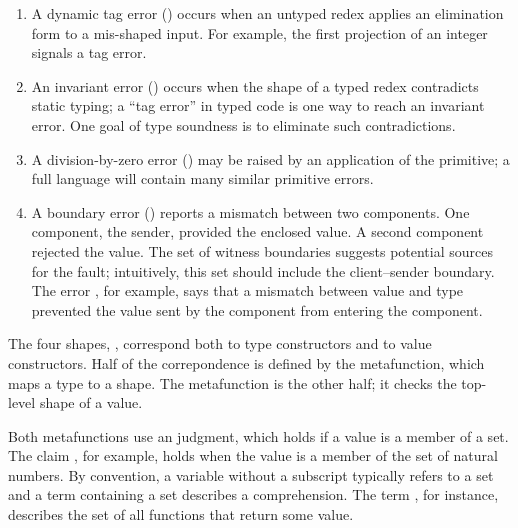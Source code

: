 \documentclass[ twoside,open=right,titlepage,numbers=noenddot,headinclude,%
                footinclude=true,cleardoublepage=empty,abstract=off,
                BCOR=5mm,paper=a4,fontsize=11pt,%
                ngerman,american,%
                parts,pdfspacing]{scrreprt}
\newlength{\stabLeft}
\newcommand{\atItemizeStart}[0]{\addtolength{\stabLeft}{\labelsep}
                                \addtolength{\stabLeft}{\labelwidth}}
\begin{document}
\noindent \begin{enumerate}\atItemizeStart

\item A dynamic tag error (\relax{$\tagerrorD{}$}) occurs when
 an untyped redex applies an elimination form to a mis{-}shaped input.
For example, the first projection of an integer signals a tag error.

\item An invariant error (\relax{$\tagerrorS{}$}) occurs when the shape of a typed
 redex contradicts static typing; a {``}tag error{''} in typed code is one
 way to reach an invariant error.
One goal of type soundness is to eliminate such contradictions.

\item A division{-}by{-}zero error (\relax{$\divisionbyzeroerror$}) may be raised by an
 application of the \relax{$\squotient$} primitive;
 a full language will contain many similar primitive errors.

\item A boundary error (\relax{$\boundaryerror{\sbset}{\svalue}$})
 reports a mismatch between two components.
One component, the sender, provided the enclosed value.
A second component rejected the value.
The set of witness boundaries suggests potential sources for the fault;
 intuitively, this set should include the client{--}sender boundary.
The error ,
 for example,
 says that a mismatch between value  and type  prevented
 the value sent by the  component from entering the  component.\end{enumerate}

The four shapes, \relax{$\stag$}, correspond both to type constructors and to value
 constructors.
Half of the correpondence is defined by the \relax{$\tagof{\cdot}$} metafunction,
 which maps a type to a shape.
The \relax{$\sshallow$} metafunction is the other half;
 it checks the top{-}level shape of a value.

Both metafunctions use an \relax{$\,\cdot \in \cdot\,$} judgment,
 which holds if a value is a member of a set.
The claim \relax{$\svalue_0 \in \snat$}, for example,  holds when the value 
 is a member of the set of natural numbers.
By convention, a variable without a subscript typically refers to a set
 and a term containing a set describes a comprehension.
The term \relax{$(\efun{\svar}{\svalue})$}, for instance, describes the
 set 
 of all functions that return some value.
\end{document}
